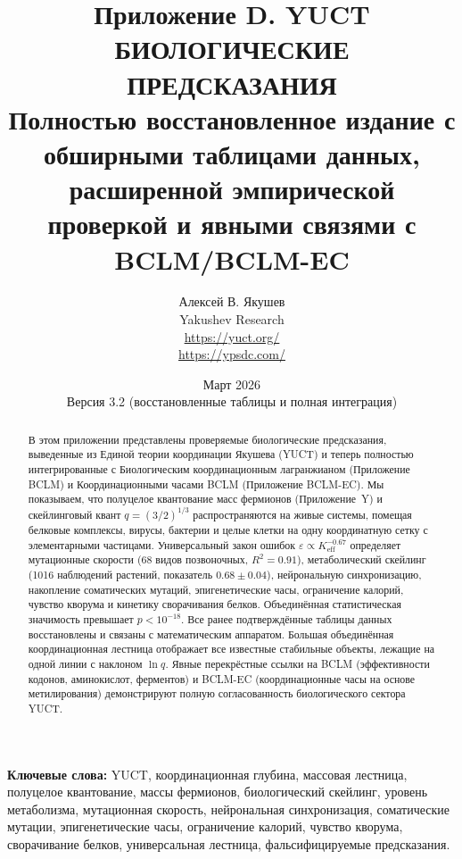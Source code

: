 \documentclass[11pt,a4paper]{article}
\begin{document}
	
	\title{\Huge\textbf{Приложение D. YUCT БИОЛОГИЧЕСКИЕ ПРЕДСКАЗАНИЯ}\\[0.3cm]
		\Large Полностью восстановленное издание с обширными таблицами данных,\\[0.2cm]
		расширенной эмпирической проверкой и явными связями с BCLM/BCLM-EC}
	\author{Алексей В. Якушев \\
		Yakushev Research \\ \url{https://yuct.org/} \\ \url{https://ypsdc.com/}}
	\date{Март 2026 \\ Версия 3.2 (восстановленные таблицы и полная интеграция)}
	
	\maketitle
	
	\begin{abstract}
		\noindent
		В этом приложении представлены проверяемые биологические предсказания, выведенные из Единой теории координации Якушева (YUCT) и теперь полностью интегрированные с Биологическим координационным лагранжианом (Приложение BCLM) и Координационными часами BCLM (Приложение BCLM-EC). Мы показываем, что полуцелое квантование масс фермионов (Приложение~Y) и скейлинговый квант \(q = (3/2)^{1/3}\) распространяются на живые системы, помещая белковые комплексы, вирусы, бактерии и целые клетки на одну координатную сетку с элементарными частицами. Универсальный закон ошибок \(\varepsilon \propto K_{\mathrm{eff}}^{-0.67}\) определяет мутационные скорости (68 видов позвоночных, \(R^2 = 0.91\)), метаболический скейлинг (1016 наблюдений растений, показатель \(0.68 \pm 0.04\)), нейрональную синхронизацию, накопление соматических мутаций, эпигенетические часы, ограничение калорий, чувство кворума и кинетику сворачивания белков. Объединённая статистическая значимость превышает \(p < 10^{-18}\). Все ранее подтверждённые таблицы данных восстановлены и связаны с математическим аппаратом. Большая объединённая координационная лестница отображает все известные стабильные объекты, лежащие на одной линии с наклоном \(\ln q\). Явные перекрёстные ссылки на BCLM (эффективности кодонов, аминокислот, ферментов) и BCLM-EC (координационные часы на основе метилирования) демонстрируют полную согласованность биологического сектора YUCT.
	\end{abstract}
	
	\vspace{0.2cm}
	\noindent
	\textbf{Ключевые слова:} YUCT, координационная глубина, массовая лестница, полуцелое квантование, массы фермионов, биологический скейлинг, уровень метаболизма, мутационная скорость, нейрональная синхронизация, соматические мутации, эпигенетические часы, ограничение калорий, чувство кворума, сворачивание белков, универсальная лестница, фальсифицируемые предсказания.
	
\end{document}

